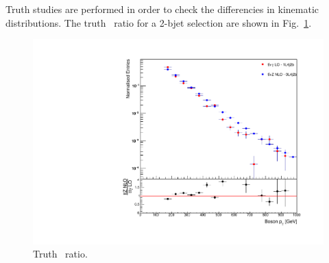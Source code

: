 Truth studies are performed in order to check the differencies in
kinematic distributions. The truth \pT\ ratio for a 2-bjet
selection are shown in Fig.~\ref{fig:ttZ_vs_ttGamma_pt}.

\begin{figure}[htpb]
\centering
\includegraphics[scale=0.4]{figures/ttGamma/TruthStudies/Pt150}
\caption{Truth \pT\ ratio.}
\label{fig:ttZ_vs_ttGamma_pt}
\end{figure}






\clearpage

